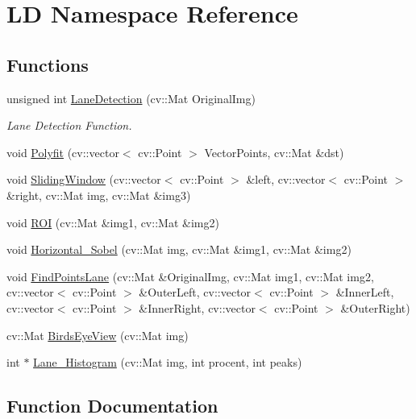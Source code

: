 \hypertarget{namespaceLD}{}\section{LD Namespace Reference}
\label{namespaceLD}
\subsection*{Functions}
\begin{DoxyCompactItemize}
\item 
unsigned int \hyperlink{namespaceLD_ac725c61b114fcf28e0fc6ddf79b22d66}{Lane\+Detection} (cv\+::\+Mat Original\+Img)
\begin{DoxyCompactList}\small\item\em Lane Detection Function. \end{DoxyCompactList}\item 
void \hyperlink{namespaceLD_a15dac98f5e6a2722f83342030086fb0f}{Polyfit} (cv\+::vector$<$ cv\+::\+Point $>$ Vector\+Points, cv\+::\+Mat \&dst)
\item 
void \hyperlink{namespaceLD_a1d90a5e486727d57152101c7c6e2c6b2}{Sliding\+Window} (cv\+::vector$<$ cv\+::\+Point $>$ \&left, cv\+::vector$<$ cv\+::\+Point $>$ \&right, cv\+::\+Mat img, cv\+::\+Mat \&img3)
\item 
void \hyperlink{namespaceLD_a2dbaaf7a39ee2d6d46c4f67cae71f651}{R\+OI} (cv\+::\+Mat \&img1, cv\+::\+Mat \&img2)
\item 
void \hyperlink{namespaceLD_ad43fbc5868819b9d2b70f00ed45142f4}{Horizontal\+\_\+\+Sobel} (cv\+::\+Mat img, cv\+::\+Mat \&img1, cv\+::\+Mat \&img2)
\item 
void \hyperlink{namespaceLD_a57364c31ed52bfa2b19a53ba9a6034f5}{Find\+Points\+Lane} (cv\+::\+Mat \&Original\+Img, cv\+::\+Mat img1, cv\+::\+Mat img2, cv\+::vector$<$ cv\+::\+Point $>$ \&Outer\+Left, cv\+::vector$<$ cv\+::\+Point $>$ \&Inner\+Left, cv\+::vector$<$ cv\+::\+Point $>$ \&Inner\+Right, cv\+::vector$<$ cv\+::\+Point $>$ \&Outer\+Right)
\item 
cv\+::\+Mat \hyperlink{namespaceLD_aec4eb31efafac4e84d22dfd0b60e4e73}{Birds\+Eye\+View} (cv\+::\+Mat img)
\item 
int $\ast$ \hyperlink{namespaceLD_a488c419fda62a06bb022fa025f4f3307}{Lane\+\_\+\+Histogram} (cv\+::\+Mat img, int procent, int peaks)
\end{DoxyCompactItemize}


\subsection{Function Documentation}
